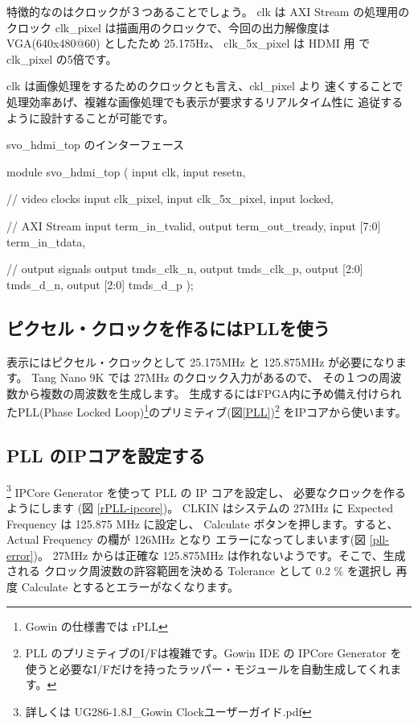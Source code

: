 特徴的なのはクロックが３つあることでしょう。
clk は AXI Stream の処理用のクロック
clk\_pixel は描画用のクロックで、今回の出力解像度は VGA(640x480@60)
としたため 25.175Hz、
clk\_5x\_pixel は HDMI 用 で clk\_pixel の5倍です。

clk は画像処理をするためのクロックとも言え、ckl\_pixel より
速くすることで処理効率あげ、複雑な画像処理でも表示が要求するリアルタイム性に
追従するように設計することが可能です。

\begin{table}
\label{svo-hdmi-top}
\caption{svo\_hdmi\_top のインターフェース}

\begin{C++}
module svo_hdmi_top (
	input clk,
	input resetn,

	// video clocks
	input clk_pixel,
	input clk_5x_pixel,
	input locked,

	// AXI Stream 
	input term_in_tvalid,
	output term_out_tready,
	input [7:0] term_in_tdata,

	// output signals
	output       tmds_clk_n,
	output       tmds_clk_p,
	output [2:0] tmds_d_n,
	output [2:0] tmds_d_p
);
\end{C++}
\end{table}

\subsection{ピクセル・クロックを作るにはPLLを使う}
表示にはピクセル・クロックとして 25.175MHz と 125.875MHz が必要になります。
Tang Nano 9K では 27MHz のクロック入力があるので、
その１つの周波数から複数の周波数を生成します。
生成するにはFPGA内に予め備え付けられたPLL(Phase Locked Loop)\footnote{Gowin
の仕様書では rPLL}のプリミティブ(図\ref{PLL})\footnote{
PLL のプリミティブのI/Fは複雑です。Gowin IDE の
IPCore Generator を使うと必要なI/Fだけを持ったラッパー・モジュールを自動生成してくれます。
}
をIPコアから使います。


\subsection{PLL のIPコアを設定する}
\footnote{詳しくは UG286-1.8J\_Gowin Clockユーザーガイド.pdf}
IPCore Generator を使って PLL の IP コアを設定し、
必要なクロックを作るようにします
(図 \ref{rPLL-ipcore})。
CLKIN はシステムの 27MHz に Expected Frequency は 125.875 MHz に設定し、
Calculate ボタンを押します。すると、Actual Frequency の欄が 126MHz となり
エラーになってしまいます(図 \ref{pll-error})。
27MHz からは正確な 125.875MHz は作れないようです。そこで、生成される
クロック周波数の許容範囲を決める Tolerance として 0.2 \% を選択し
再度 Calculate とするとエラーがなくなります。

